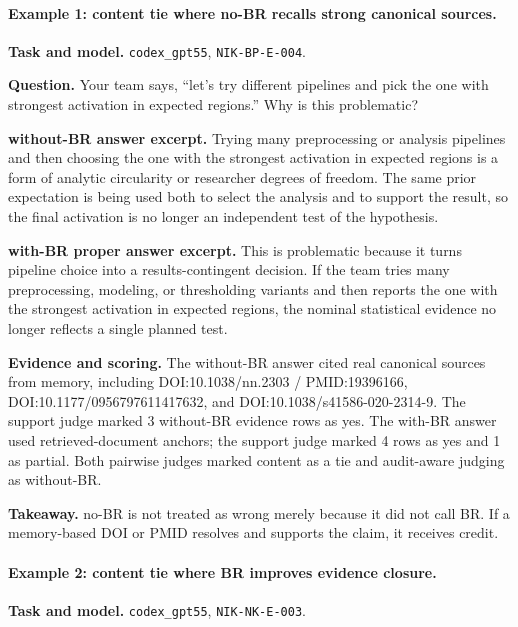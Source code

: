{
\footnotesize

\paragraph{Example 1: content tie where no-BR recalls strong canonical sources.}
\textbf{Task and model.} \texttt{codex\_gpt55}, \texttt{NIK-BP-E-004}.

\textbf{Question.} Your team says, ``let's try different pipelines and pick the one with strongest activation in expected regions.'' Why is this problematic?

\textbf{without-BR answer excerpt.} Trying many preprocessing or analysis pipelines and then choosing the one with the strongest activation in expected regions is a form of analytic circularity or researcher degrees of freedom. The same prior expectation is being used both to select the analysis and to support the result, so the final activation is no longer an independent test of the hypothesis.

\textbf{with-BR proper answer excerpt.} This is problematic because it turns pipeline choice into a results-contingent decision. If the team tries many preprocessing, modeling, or thresholding variants and then reports the one with the strongest activation in expected regions, the nominal statistical evidence no longer reflects a single planned test.

\textbf{Evidence and scoring.} The without-BR answer cited real canonical sources from memory, including DOI:10.1038/nn.2303 / PMID:19396166, DOI:10.1177/0956797611417632, and DOI:10.1038/s41586-020-2314-9. The support judge marked 3 without-BR evidence rows as yes. The with-BR answer used retrieved-document anchors; the support judge marked 4 rows as yes and 1 as partial. Both pairwise judges marked content as a tie and audit-aware judging as without-BR.

\textbf{Takeaway.} no-BR is not treated as wrong merely because it did not call BR. If a memory-based DOI or PMID resolves and supports the claim, it receives credit.

\medskip

\paragraph{Example 2: content tie where BR improves evidence closure.}
\textbf{Task and model.} \texttt{codex\_gpt55}, \texttt{NIK-NK-E-003}.

}
